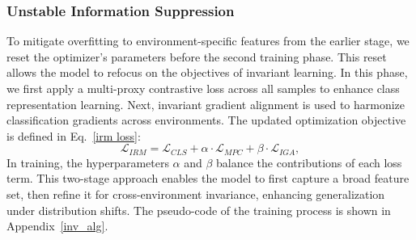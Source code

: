 \subsubsection{Unstable Information Suppression}
To mitigate overfitting to environment-specific features from the earlier stage, we reset the optimizer’s parameters before the second training phase. This reset allows the model to refocus on the objectives of invariant learning. In this phase, we first apply a multi-proxy contrastive loss across all samples to enhance class representation learning. Next, invariant gradient alignment is used to harmonize classification gradients across environments. The updated optimization objective is defined in Eq.~\ref{irm loss}:
\begin{equation}
\label{irm loss}
\mathcal{L}_{IRM} = \mathcal{L}_{CLS} + \alpha \cdot \mathcal{L}_{MPC} + \beta \cdot \mathcal{L}_{IGA},
\end{equation}
In training, the hyperparameters $\alpha$ and $\beta$ balance the contributions of each loss term. This two-stage approach enables the model to first capture a broad feature set, then refine it for cross-environment invariance, enhancing generalization under distribution shifts. The pseudo-code of the training process is shown in Appendix~\ref{inv_alg}.